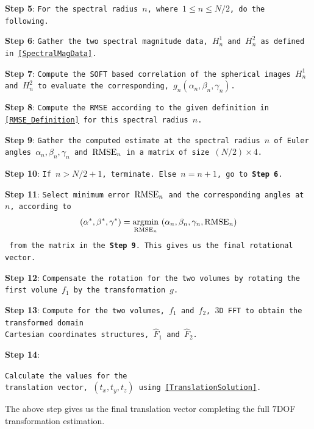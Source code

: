 \documentclass{UCF_ETD}
\begin{document}
\textbf{Step 5}: {\tt For the spectral radius $n$, where $1 \leq n \leq N/2$, do the following.}

\textbf{Step 6}: {\tt Gather the two spectral magnitude data, $H^1_n$ and $H^2_n$ as defined in \eqref{SpectralMagData}.}

\textbf{Step 7}: {\tt Compute the SOFT based correlation of the spherical images $H^1_n$ and $H^2_n$ to evaluate the corresponding, $g_n (\alpha_n, \beta_n, \gamma_n)$. }

\textbf{Step 8}: {\tt Compute the RMSE according to the given definition in \eqref{RMSE_Definition} for this spectral radius $n$.}

\textbf{Step 9}: {\tt Gather the computed estimate at the spectral radius $n$ of Euler angles $\alpha_n, \beta_n, \gamma_n$ and ${\rm RMSE}_n$  in a matrix of size $(N/2) \times 4$.}

\textbf{Step 10}: {\tt If $n > N/2 + 1$, terminate. Else $n = n+1$, go to \textbf{Step 6}.}

\textbf{Step 11}: {\tt Select minimum error $ {\rm RMSE}_n$ and the corresponding angles at $n$, according to
\begin{equation*}
(\alpha^*, \beta^*, \gamma^*)=\underset{{\rm RMSE}_n}{\operatorname{argmin}} ~ (\alpha_n, \beta_n, \gamma_n,{\rm RMSE}_n)
\end{equation*}
from the matrix in the \textbf{Step 9}. This gives us the final rotational vector.}

\textbf{Step 12}: {\tt Compensate the rotation for the two volumes  by rotating the first volume $f_1$ by the transformation $g$.}

\textbf{Step 13}: {\tt Compute for the two volumes, $f_1$ and $f_2$, $3$D FFT to obtain the transformed domain \\ Cartesian coordinates structures, $\hat{F}_1$ and $\hat{F}_2$.}

\textbf{Step 14}: {\tt Calculate the values for the \\ translation vector, $(t_x,t_y,t_z)$ using \eqref{TranslationSolution}. 

The above step gives us the final translation vector completing the full $7$DOF transformation estimation. }
\end{document}
